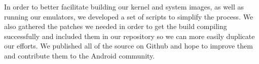 In order to better facilitate building our kernel and system images, as well as running our emulators, we developed a set of scripts to simplify the process.
We also gathered the patches we needed in order to get the build compiling successfully and included them in our repository so we can more easily duplicate our efforts. 
We published all of the source on Github and hope to improve them and contribute them to the Android community.\cite{lindiakos_github_2012}
